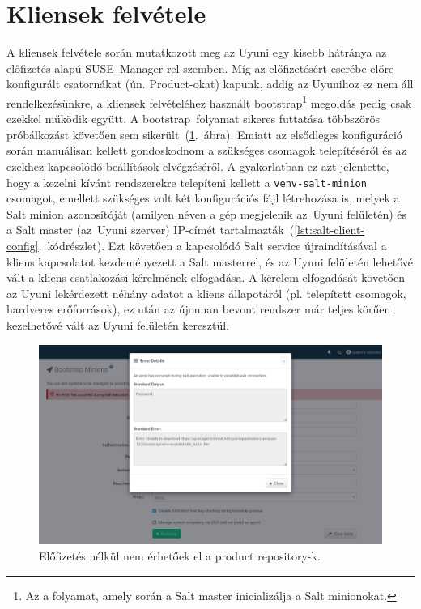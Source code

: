 \section{Kliensek felvétele}
A kliensek felvétele során mutatkozott meg az Uyuni egy kisebb hátránya az előfizetés-alapú SUSE~Manager-rel szemben. Míg az előfizetésért cserébe előre konfigurált csatornákat (ún. Product-okat) kapunk, addig az Uyunihoz ez nem áll rendelkezésünkre, a kliensek felvételéhez használt bootstrap\footnote{Az a folyamat, amely során a Salt master inicializálja a Salt minionokat.} megoldás pedig csak ezekkel működik együtt. A bootstrap~folyamat sikeres futtatása többszörös próbálkozást követően sem sikerült~(\ref{fig:uyuni-bootstrap-error}.~ábra). Emiatt az elsődleges konfiguráció során manuálisan kellett gondoskodnom a szükséges csomagok telepítéséről és az ezekhez kapcsolódó beállítások elvégzéséről. A gyakorlatban ez azt jelentette, hogy a kezelni kívánt rendszerekre telepíteni kellett a \texttt{venv-salt-minion} csomagot, emellett szükséges volt két konfigurációs fájl létrehozása is, melyek a Salt minion azonosítóját (amilyen néven a gép megjelenik az~Uyuni felületén) és a Salt master (az~Uyuni szerver) IP-címét tartalmazták~(\ref{lst:salt-client-config}.~kódrészlet).
Ezt követően a kapcsolódó Salt service újraindításával a kliens kapcsolatot kezdeményezett a Salt masterrel, és az Uyuni felületén lehetővé vált a kliens csatlakozási kérelmének elfogadása. A kérelem elfogadását követően az Uyuni lekérdezett néhány adatot a kliens állapotáról (pl. telepített csomagok, hardveres erőforrások), ez után az újonnan bevont rendszer már teljes körűen kezelhetővé vált az Uyuni felületén keresztül.

\begin{figure}[ht]
	\centering
	\includegraphics[width=15cm]{figures/uyuni-bootstrap-error.png}
	\caption{Előfizetés nélkül nem érhetőek el a product repository-k.}
	\label{fig:uyuni-bootstrap-error}
\end{figure}

